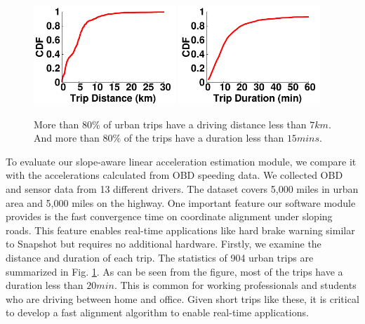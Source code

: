 \begin{figure}[!tbph]
	\begin{center}
\includegraphics[width=2.1in,angle=0]{Figs/SlopeAware/all_dist.pdf}
\hspace{-0.6cm}
\includegraphics[width=2.1in,angle=0]{Figs/SlopeAware/all_time.pdf}
\hspace{-0.5cm}
\vspace{-0.0cm}
\caption{More than $80\%$ of urban trips have a driving distance less than $7km$.
And more than $80\%$ of the trips have a duration less than $15mins$.}
\vspace{0.0cm}
\label{tripstats}
\end{center}
\end{figure}


To evaluate our slope-aware linear acceleration estimation module, 
we compare it with the accelerations calculated from OBD speeding
data. 
We collected OBD and sensor data from 13 different drivers. 
The dataset covers 5,000 miles in urban area and 5,000 miles on the highway. 
One important feature our software module provides is the fast convergence
time on coordinate alignment under sloping roads.
This feature enables real-time applications like hard 
brake warning similar to Snapshot \cite{snapshot} 
but requires no additional hardware. 
Firstly, we examine the distance and duration of each trip.
The statistics of 904 urban trips are summarized in Fig. \ref{tripstats}.  
As can be seen from the figure, most of the trips have a duration less than $20min$.
This is common for working professionals and students who are 
driving between home and office.
Given short trips like these, it is critical to develop
a fast alignment algorithm to enable real-time applications.


